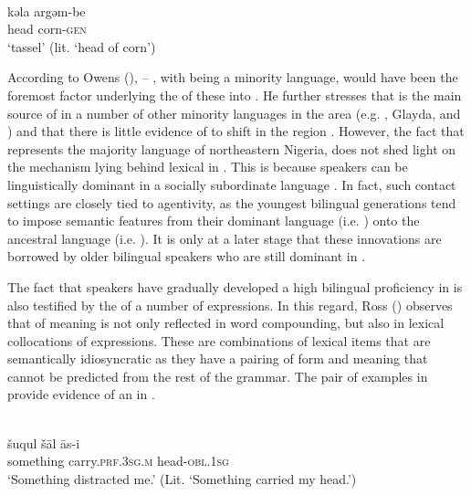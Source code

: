 \documentclass[output=paper]{langsci/langscibook}
\begin{document}
\\
\gll   kǝla argǝm-be \\
       head corn-\textsc{gen} \\
\glt   `tassel' (lit. ‘head of corn')
\z
\z

According to Owens (\citeyear[65]{Owens2016idioms}), – , with  being a minority language, would have been the foremost factor underlying the  of these  into  . He further stresses that  is the main source of  in a number of other minority languages in the area (e.g. , Glayda, and ) and that there is little evidence of  to  shift in the region \citep[147]{Owens2014}. However, the fact that  represents the majority language of northeastern Nigeria, does not shed light on the  mechanism lying behind lexical  in  . This is because speakers can be linguistically dominant in a socially subordinate language \citep[376]{Winford2005}. In fact, such contact settings are closely tied to  agentivity, as the youngest bilingual generations tend to impose semantic features from their dominant language (i.e. ) onto the ancestral language (i.e. ). It is only at a later stage that these innovations are borrowed by older bilingual speakers who are still dominant in . 

The fact that   speakers have gradually developed a high bilingual proficiency in  is also testified by the  of a number of  expressions. In this regard, Ross (\citeyear[122]{Ross2007}) observes that  of meaning is not only reflected in word compounding, but also in lexical collocations of  expressions. These are combinations of lexical items that are semantically idiosyncratic as they have a pairing of form and meaning that cannot be predicted from the rest of the grammar. The pair of examples in  provide evidence of an    in  . 

\ea\label{distract}
\\
\gll   šuqul šāl {\R}ās-i\\
       something carry.\textsc{prf.3sg.m} head-\textsc{obl.1sg}\\
\glt   `Something distracted me.' (Lit. ‘Something carried my head.’)
\end{document}
